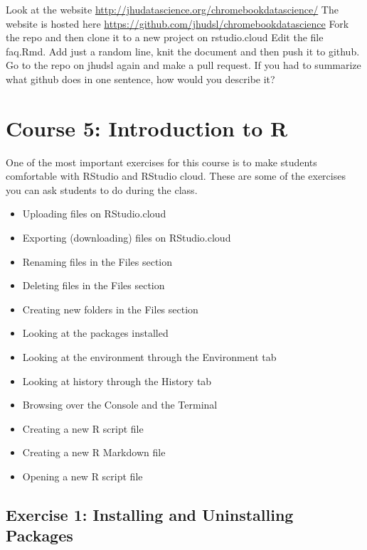 \documentclass[]{book}
\providecommand{\tightlist}{%
  \setlength{\itemsep}{0pt}\setlength{\parskip}{0pt}}
\begin{document}
Look at the website \url{http://jhudatascience.org/chromebookdatascience/}
The website is hosted here \url{https://github.com/jhudsl/chromebookdatascience}
Fork the repo and then clone it to a new project on rstudio.cloud
Edit the file faq.Rmd. Add just a random line, knit the document and then push it to github.
Go to the repo on jhudsl again and make a pull request.
If you had to summarize what github does in one sentence, how would you describe it?

\hypertarget{intro-r}{%
\chapter*{Course 5: Introduction to R}\label{intro-r}}

One of the most important exercises for this course is to make students comfortable with RStudio and RStudio cloud. These are some of the exercises you can ask students to do during the class.

\begin{itemize}
\tightlist
\item
  Uploading files on RStudio.cloud
\item
  Exporting (downloading) files on RStudio.cloud
\item
  Renaming files in the Files section
\item
  Deleting files in the Files section
\item
  Creating new folders in the Files section
\item
  Looking at the packages installed
\item
  Looking at the environment through the Environment tab
\item
  Looking at history through the History tab
\item
  Browsing over the Console and the Terminal
\item
  Creating a new R script file
\item
  Creating a new R Markdown file
\item
  Opening a new R script file
\end{itemize}

\hypertarget{exercise-1-installing-and-uninstalling-packages}{%
\section*{Exercise 1: Installing and Uninstalling Packages}\label{exercise-1-installing-and-uninstalling-packages}}
\end{document}
